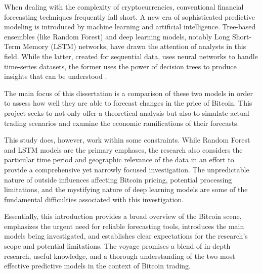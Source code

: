 When dealing with the complexity of cryptocurrencies, conventional financial forecasting techniques frequently fall short. A new era of sophisticated predictive modeling is introduced by machine learning and artificial intelligence. Tree-based ensembles (like Random Forest) and deep learning models, notably Long Short-Term Memory (LSTM) networks, have drawn the attention of analysts in this field. While the latter, created for sequential data, uses neural networks to handle time-series datasets, the former uses the power of decision trees to produce insights that can be understood \citep{Hochreiter1997LongSM}.

\smallskip

The main focus of this dissertation is a comparison of these two models in order to assess how well they are able to forecast changes in the price of Bitcoin. This project seeks to not only offer a theoretical analysis but also to simulate actual trading scenarios and examine the economic ramifications of their forecasts.

\smallskip

This study does, however, work within some constraints. While Random Forest and LSTM models are the primary emphases, the research also considers the particular time period and geographic relevance of the data in an effort to provide a comprehensive yet narrowly focused investigation. The unpredictable nature of outside influences affecting Bitcoin pricing, potential processing limitations, and the mystifying nature of deep learning models are some of the fundamental difficulties associated with this investigation.

\smallskip

Essentially, this introduction provides a broad overview of the Bitcoin scene, emphasizes the urgent need for reliable forecasting tools, introduces the main models being investigated, and establishes clear expectations for the research's scope and potential limitations. The voyage promises a blend of in-depth research, useful knowledge, and a thorough understanding of the two most effective predictive models in the context of Bitcoin trading.


\bigskip
\goodbreak

\goodbreak

\def\baselinestretch{1.1}
 

   


\def\baselinestretch{1.66}
\medskip


